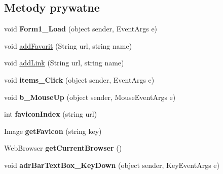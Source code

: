 \subsection*{Metody prywatne}
\begin{DoxyCompactItemize}
\item 
\mbox{\label{class_windows_forms_app2_1_1_przegladarka_a7d52cb2619b2a3c247a6f420ee7a6ef4}} 
void {\bfseries Form1\+\_\+\+Load} (object sender, Event\+Args e)
\item 
void \hyperlink{class_windows_forms_app2_1_1_przegladarka_ae81e3a8848fdaaecd2f51a2f17e60540}{add\+Favorit} (String url, string name)
\item 
void \hyperlink{class_windows_forms_app2_1_1_przegladarka_a317944e036dffa9dbae17e072ffce939}{add\+Link} (String url, string name)
\item 
\mbox{\label{class_windows_forms_app2_1_1_przegladarka_a09bd06ccc833afe04008333d58e873b1}} 
void {\bfseries items\+\_\+\+Click} (object sender, Event\+Args e)
\item 
\mbox{\label{class_windows_forms_app2_1_1_przegladarka_a263c2982999a825c5df27a3d0394f8a6}} 
void {\bfseries b\+\_\+\+Mouse\+Up} (object sender, Mouse\+Event\+Args e)
\item 
\mbox{\label{class_windows_forms_app2_1_1_przegladarka_a7ebc793c65547468c33de98bca06db2f}} 
int {\bfseries favicon\+Index} (string url)
\item 
\mbox{\label{class_windows_forms_app2_1_1_przegladarka_a6d41c318a647f8a1054fdbe57c3c132a}} 
Image {\bfseries get\+Favicon} (string key)
\item 
\mbox{\label{class_windows_forms_app2_1_1_przegladarka_a4d940c14c495053bb984ff254991afbc}} 
Web\+Browser {\bfseries get\+Current\+Browser} ()
\item 
\mbox{\label{class_windows_forms_app2_1_1_przegladarka_a2c16d9618e633748a8a7eb8c3daa6dc7}} 
void {\bfseries adr\+Bar\+Text\+Box\+\_\+\+Key\+Down} (object sender, Key\+Event\+Args e)

\end{DoxyCompactItemize}
